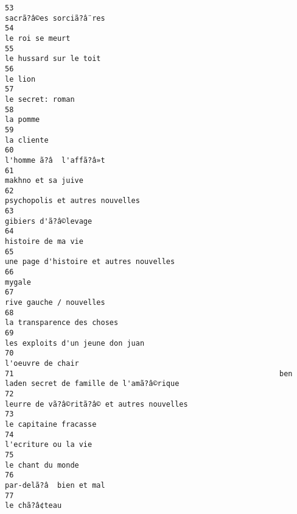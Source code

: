 \documentclass[
]{report}
\begin{document}
\begin{verbatim}
53                                                                                  sacrã?â©es sorciã?â¨res
54                                                                                          le roi se meurt
55                                                                                   le hussard sur le toit
56                                                                                                  le lion
57                                                                                         le secret: roman
58                                                                                                 la pomme
59                                                                                               la cliente
60                                                                                  l'homme ã?â  l'affã?â»t
61                                                                                       makhno et sa juive
62                                                                          psychopolis et autres nouvelles
63                                                                                     gibiers d'ã?â©levage
64                                                                                       histoire de ma vie
65                                                                  une page d'histoire et autres nouvelles
66                                                                                                   mygale
67                                                                                  rive gauche / nouvelles
68                                                                               la transparence des choses
69                                                                         les exploits d'un jeune don juan
70                                                                                        l'oeuvre de chair
71                                                             ben laden secret de famille de l'amã?â©rique
72                                                               leurre de vã?â©ritã?â© et autres nouvelles
73                                                                                    le capitaine fracasse
74                                                                                     l'ecriture ou la vie
75                                                                                        le chant du monde
76                                                                                  par-delã?â  bien et mal
77                                                                                            le chã?â¢teau

\end{verbatim}
\end{document}
